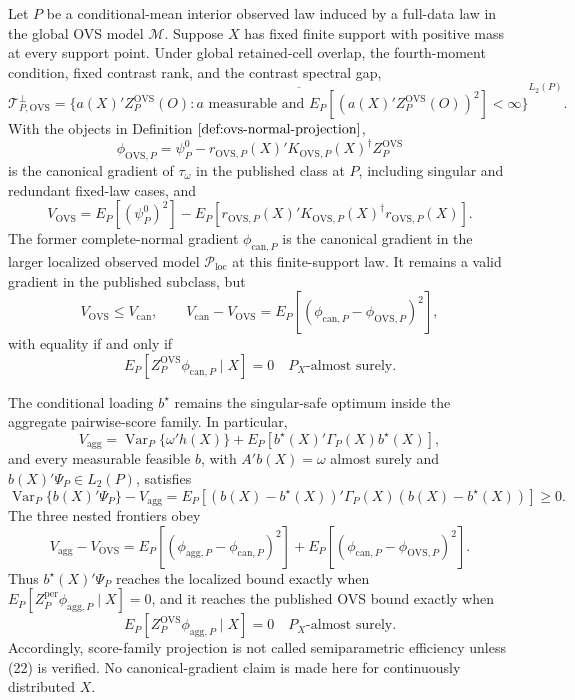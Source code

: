 Let \(P\) be a conditional-mean interior observed law induced by a full-data law in the global OVS model \(\mathcal M\).  Suppose \(X\) has fixed finite support with positive mass at every support point.  Under global retained-cell overlap, the fourth-moment condition, fixed contrast rank, and the contrast spectral gap,
\[
\mathcal T_{P,\mathrm{OVS}}^\perp
=\overline{\{a(X)'Z_P^{\mathrm{OVS}}(O):a\text{ measurable and }
E_P[(a(X)'Z_P^{\mathrm{OVS}}(O))^2]<\infty\}}^{L_2(P)}.
\]
With the objects in Definition \(\ref{def:ovs-normal-projection}\),
\[
\phi_{\mathrm{OVS},P}
=\psi_P^0-r_{\mathrm{OVS},P}(X)'K_{\mathrm{OVS},P}(X)^\dagger
Z_P^{\mathrm{OVS}}
\tag{15}
\]
is the canonical gradient of \(\tau_\omega\) in the published class at \(P\), including singular and redundant fixed-law cases, and
\[
V_{\mathrm{OVS}}
=E_P[(\psi_P^0)^2]
-E_P[r_{\mathrm{OVS},P}(X)'K_{\mathrm{OVS},P}(X)^\dagger r_{\mathrm{OVS},P}(X)].
\tag{16}
\]
The former complete-normal gradient \(\phi_{\mathrm{can},P}\) is the canonical gradient in the larger localized observed model \(\mathcal P_{\mathrm{loc}}\) at this finite-support law.  It remains a valid gradient in the published subclass, but
\[
V_{\mathrm{OVS}}\le V_{\mathrm{can}},
\qquad
V_{\mathrm{can}}-V_{\mathrm{OVS}}
=E_P[(\phi_{\mathrm{can},P}-\phi_{\mathrm{OVS},P})^2],
\tag{17}
\]
with equality if and only if
\[
E_P[Z_P^{\mathrm{OVS}}\phi_{\mathrm{can},P}\mid X]=0
\quad P_X\text{-almost surely}.
\tag{18}
\]

The conditional loading \(b^\star\) remains the singular-safe optimum inside the aggregate pairwise-score family.  In particular,
\[
V_{\mathrm{agg}}
=\operatorname{Var}_P\{\omega'h(X)\}
+E_P[b^\star(X)'\Gamma_P(X)b^\star(X)],
\tag{19}
\]
and every measurable feasible \(b\), with \(A'b(X)=\omega\) almost surely and \(b(X)'\Psi_P\in L_2(P)\), satisfies
\[
\operatorname{Var}_P\{b(X)'\Psi_P\}-V_{\mathrm{agg}}
=E_P[(b(X)-b^\star(X))'\Gamma_P(X)(b(X)-b^\star(X))]\ge0.
\tag{20}
\]
The three nested frontiers obey
\[
V_{\mathrm{agg}}-V_{\mathrm{OVS}}
=E_P[(\phi_{\mathrm{agg},P}-\phi_{\mathrm{can},P})^2]
+E_P[(\phi_{\mathrm{can},P}-\phi_{\mathrm{OVS},P})^2].
\tag{21}
\]
Thus \(b^\star(X)'\Psi_P\) reaches the localized bound exactly when \(E_P[Z_P^{\mathrm{per}}\phi_{\mathrm{agg},P}\mid X]=0\), and it reaches the published OVS bound exactly when
\[
E_P[Z_P^{\mathrm{OVS}}\phi_{\mathrm{agg},P}\mid X]=0
\quad P_X\text{-almost surely}.
\tag{22}
\]
Accordingly, score-family projection is not called semiparametric efficiency unless (22) is verified.  No canonical-gradient claim is made here for continuously distributed \(X\).

